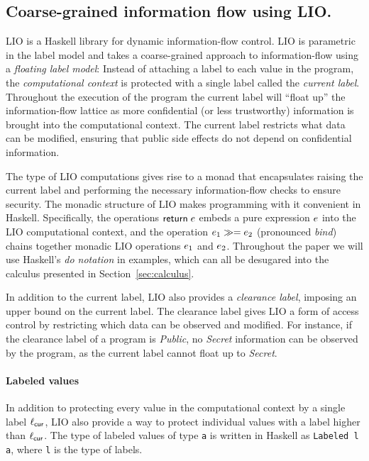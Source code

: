 \subsection{Coarse-grained information flow using LIO.}
LIO \cite{SRMMlio} is a Haskell library for dynamic information-flow control. LIO is parametric in the label model and takes a coarse-grained approach to information-flow using a \emph{floating label model}: Instead of attaching a label to each value in the program, the \emph{computational context} is protected with a single label called the \emph{current label}. Throughout the execution of the program the current label will ``float up'' the information-flow lattice as more confidential (or less trustworthy) information is brought into the computational context. The current label restricts what data can be modified, ensuring that public side effects do not depend on confidential information.

The type of LIO computations gives rise to a monad \cite{Wadler:1995:MFP:647698.734146} that encapsulates raising the current label and performing the necessary information-flow checks to ensure security. The monadic structure of LIO makes programming with it convenient in Haskell. Specifically, the operations $\mathsf{return}\;e$ embeds a pure expression $e$ into the LIO computational context, and the operation $e_1 \gg= e_2$ (pronounced \emph{bind}) chains together monadic LIO operations $e_1$ and $e_2$. Throughout the paper we will use Haskell's \emph{do notation} in examples, which can all be desugared into the calculus presented in Section~\ref{sec:calculus}.

In addition to the current label, LIO also provides a \emph{clearance label}, imposing an upper bound on the current label. The clearance label gives LIO a form of access control by restricting which data can be observed and modified. For instance, if the clearance label of a program is \emph{Public}, no \emph{Secret} information can be observed by the program, as the current label cannot float up to \emph{Secret}.

\paragraph{Labeled values}
In addition to protecting every value in the computational context by a single label $\ell_{\mathsf{cur}}$, LIO also provide a way to protect individual values with a label higher than $\ell_{\mathsf{cur}}$. The type of labeled values of type \texttt{a} is written in Haskell as \texttt{Labeled l a}, where \texttt{l} is the type of labels.

